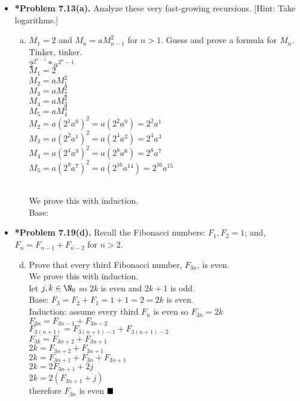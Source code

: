 \documentclass[11pt]{article}
\begin{document}
\begin{itemize}
\vspace{0.1in}

\item \textbf{*Problem 7.13(a).}
Analyze these very fast-growing recursions.
[Hint: Take logarithms.]
\begin{enumerate}[(a)]
\item $M_1=2$ and $M_n=aM_{n-1}^2$ for $n>1$.
Guess and prove a formula for $M_n$.
Tinker, tinker.
\\$2^{2^{n-1}}*a^{2^n-1}$
\\$M_1=2$
\\$M_2=aM_1^2$
\\$M_3=aM_2^2$
\\$M_4=aM_3^2$
\\$M_5=aM_4^2$
\\$M_2=a(2^1a^0)^2=a(2^2a^0)=2^2a^1$
\\$M_3=a(2^2a^1)^2=a(2^4a^2)=2^4a^3$
\\$M_4=a(2^4a^3)^2=a(2^8a^6)=2^8a^7$
\\$M_5=a(2^8a^7)^2=a(2^16a^14)=2^16a^15$

\\We prove this with induction.
\\Base: 
\end{enumerate}

\vspace{0.1in}

\item \textbf{*Problem 7.19(d).}
Recall the Fibonacci numbers: $F_1,F_2=1$; and, $F_n=F_{n-1}+F_{n-2}$ for $n>2$.
\begin{enumerate}[(a)]
\setcounter{enumi}{3}
\item Prove that every third Fibonacci number, $F_{3n}$, is even.
\\We prove this with induction.
\\let $j,k\in\N_0$ so $2k$ is even and $2k+1$ is odd.
\\Base: $F_3=F_2+F_1=1+1=2=2k$ is even.
\\Induction: assume every third $F_n$ is even so $F_{3n}=2k$
\\$F_{3n}=F_{3n-1}+F_{3n-2}$
\\$F_{3(n+1)}=F_{3(n+1)-1}+F_{3(n+1)-2}$
\\$F_{3k}=F_{3n+2}+F_{3n+1}$
\\$2k=F_{3n+2}+F_{3n+1}$
\\$2k=F_{3n+1}+F_{3n}+F_{3n+1}$
\\$2k=2F_{3n+1}+2j$
\\$2k=2(F_{3n+1}+j)$
\\therefore $F_{3n}$ is even $\hfill\blacksquare$
\end{enumerate}


\end{itemize}
\end{document}
